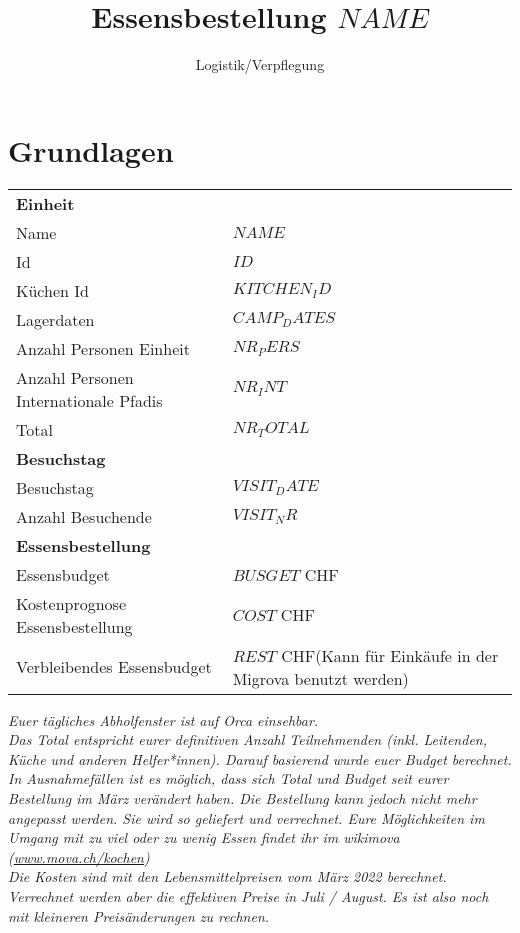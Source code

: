 \documentclass[11pt]{article}
\author{Logistik/Verpflegung}
\title{Essensbestellung $NAME$}
\begin{document}
	\section*{Grundlagen}

		\begin{tabular}{ll}
            \textbf{Einheit}\\
            Name & $NAME$ \\
            Id & $ID$\\
            K\"uchen Id & $KITCHEN_ID$\\
            Lagerdaten & $CAMP_DATES$ \\
            Anzahl Personen Einheit & $NR_PERS$\\
            Anzahl Personen Internationale Pfadis & $NR_INT$\\
            Total & $NR_TOTAL$\\
            \textbf{Besuchstag}\\
            Besuchstag & $VISIT_DATE$\\
            Anzahl Besuchende & $VISIT_NR$\\
            \textbf{Essensbestellung}\\
            Essensbudget & $BUSGET$ CHF\\
            Kostenprognose Essensbestellung & $COST$ CHF\\
            Verbleibendes Essensbudget & $REST$ CHF\hspace{1cm}(Kann f\"ur Eink\"aufe in der Migrova benutzt werden)  \\
        \end{tabular}

\vspace{1cm}
\textit{Euer t\"agliches Abholfenster ist auf Orca einsehbar.}\\

\textit{Das Total entspricht eurer definitiven Anzahl Teilnehmenden (inkl. Leitenden, K\"uche und anderen Helfer*innen). Darauf basierend wurde euer Budget berechnet. In Ausnahmef\"allen ist es m\"oglich, dass sich Total und Budget seit eurer Bestellung im M\"arz ver\"andert haben. Die Bestellung kann jedoch nicht mehr angepasst werden. Sie wird so geliefert und verrechnet. Eure M\"oglichkeiten im Umgang mit zu viel oder zu wenig Essen findet ihr im wikimova (\href{https://www.mova.ch/kochen}{www.mova.ch/kochen})}\\

\textit{Die Kosten sind mit den Lebensmittelpreisen vom M\"arz 2022 berechnet. Verrechnet werden aber die effektiven Preise in Juli / August. Es ist also noch mit kleineren Preis\"anderungen zu rechnen.}
\color{black}

\newpage
\small
\end{document}
